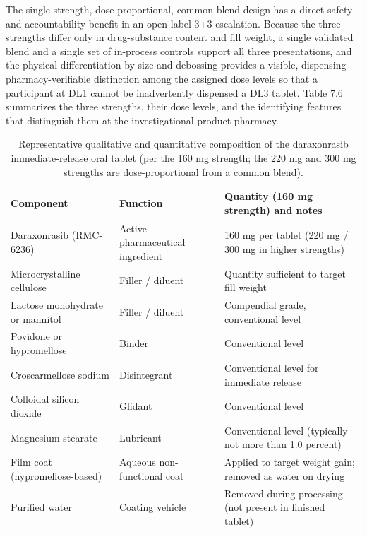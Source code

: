 The single-strength, dose-proportional, common-blend design has a direct safety
and accountability benefit in an open-label 3+3 escalation. Because the three
strengths differ only in drug-substance content and fill weight, a single
validated blend and a single set of in-process controls support all three
presentations, and the physical differentiation by size and debossing provides a
visible, dispensing-pharmacy-verifiable distinction among the assigned dose
levels so that a participant at DL1 cannot be inadvertently dispensed a DL3
tablet. Table 7.6 summarizes the three strengths, their dose levels, and the
identifying features that distinguish them at the investigational-product
pharmacy.

\begin{table}[t]
\centering
\caption{Representative qualitative and quantitative composition of the
daraxonrasib immediate-release oral tablet (per the 160 mg strength; the 220 mg
and 300 mg strengths are dose-proportional from a common blend).}
\label{tab:cmc-dp-comp}
\begin{tabularx}{\textwidth}{L{4.4cm} L{4.6cm} Y}
\toprule
\textbf{Component} & \textbf{Function} & \textbf{Quantity (160 mg strength) and notes} \\
\midrule
Daraxonrasib (RMC-6236) & Active pharmaceutical ingredient & 160 mg per tablet (220 mg / 300 mg in higher strengths) \\
Microcrystalline cellulose & Filler / diluent & Quantity sufficient to target fill weight \\
Lactose monohydrate or mannitol & Filler / diluent & Compendial grade, conventional level \\
Povidone or hypromellose & Binder & Conventional level \\
Croscarmellose sodium & Disintegrant & Conventional level for immediate release \\
Colloidal silicon dioxide & Glidant & Conventional level \\
Magnesium stearate & Lubricant & Conventional level (typically not more than 1.0 percent) \\
Film coat (hypromellose-based) & Aqueous non-functional coat & Applied to target weight gain; removed as water on drying \\
Purified water & Coating vehicle & Removed during processing (not present in finished tablet) \\
\bottomrule
\end{tabularx}
\vspace*{-0.25cm}
\end{table}

